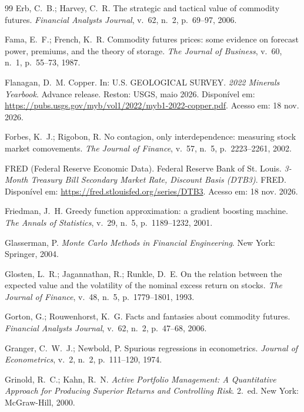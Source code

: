 \begin{thebibliography}{99}
Erb, C.~B.; Harvey, C.~R. The strategic and tactical value of commodity futures. \emph{Financial Analysts Journal}, v.~62, n.~2, p.~69--97, 2006.

Fama, E.~F.; French, K.~R. Commodity futures prices: some evidence on forecast power, premiums, and the theory of storage. \emph{The Journal of Business}, v.~60, n.~1, p.~55--73, 1987.

Flanagan, D.~M. Copper. In: U.S. GEOLOGICAL SURVEY. \emph{2022 Minerals Yearbook}. Advance release. Reston: USGS, maio 2026. Disponível em: \url{https://pubs.usgs.gov/myb/vol1/2022/myb1-2022-copper.pdf}. Acesso em: 18 nov. 2026.

Forbes, K.~J.; Rigobon, R. No contagion, only interdependence: measuring stock market comovements. \emph{The Journal of Finance}, v.~57, n.~5, p.~2223--2261, 2002.

FRED (Federal Reserve Economic Data). Federal Reserve Bank of St. Louis. \emph{3-Month Treasury Bill Secondary Market Rate, Discount Basis (DTB3)}. FRED. Disponível em: \url{https://fred.stlouisfed.org/series/DTB3}. Acesso em: 18 nov. 2026.

Friedman, J.~H. Greedy function approximation: a gradient boosting machine. \emph{The Annals of Statistics}, v.~29, n.~5, p.~1189--1232, 2001.

Glasserman, P. \emph{Monte Carlo Methods in Financial Engineering}. New York: Springer, 2004.

Glosten, L.~R.; Jagannathan, R.; Runkle, D.~E. On the relation between the expected value and the volatility of the nominal excess return on stocks. \emph{The Journal of Finance}, v.~48, n.~5, p.~1779--1801, 1993.

Gorton, G.; Rouwenhorst, K.~G. Facts and fantasies about commodity futures. \emph{Financial Analysts Journal}, v.~62, n.~2, p.~47--68, 2006.

Granger, C.~W.~J.; Newbold, P. Spurious regressions in econometrics. \emph{Journal of Econometrics}, v.~2, n.~2, p.~111--120, 1974.

Grinold, R.~C.; Kahn, R.~N. \emph{Active Portfolio Management: A Quantitative Approach for Producing Superior Returns and Controlling Risk}. 2.~ed. New York: McGraw-Hill, 2000.


\end{thebibliography}
